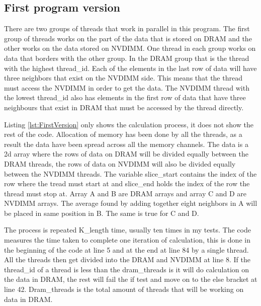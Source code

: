\documentclass[12pt,a4paper,USenglish]{article}      %
\begin{document}
\subsection{First program version}
There are two groups of threads that work in parallel in this program. The first group of threads works on the part of the data that is stored on DRAM and the other works on the data stored on NVDIMM. 
One thread in each group works on data that borders with the other group. In the DRAM group that is the thread with the highest thread\_id. Each of the elements in the last row of data will have three neighbors that exist on the NVDIMM side. This means that the thread must access the NVDIMM in order to get the data. The NVDIMM thread with the lowest thread\_id also has elements in the first row of data that have three neighbours that exist in DRAM that must be accessed by the thread directly.

Listing \ref{lst:FirstVersion} only shows the calculation process, it does not show the rest of the code. Allocation of memory has been done by all the threads, as a result the data have been spread across all the memory channels. 
The data is a 2d array where the rows of data on DRAM will be divided equally between the DRAM threads, the rows of data on NVDIMM will also be divided equally between the NVDIMM threads. The variable slice\_start contains the index of the row where the tread must start at and slice\_end holds the index of the row the thread must stop at.
Array A and B are DRAM arrays and array C and D are NVDIMM arrays. The average found by adding together eight neighbors in A will be placed in same position in B. The same is true for C and D.

The process is repeated K\_length time, usually ten times in my tests.
The code measures the time taken to complete one iteration of calculation, this is done in the beginning of the code at line 5 and at the end at line 84 by a single thread.
All the threads then get divided into the DRAM and NVDIMM at line 8. If the thread\_id of a thread is less than the dram\_threads is it will do calculation on the data in DRAM, the rest will fail the if test and move on to the else bracket at line 42. Dram\_threads is the total amount of threads that will be working on data in DRAM.
\end{document}
